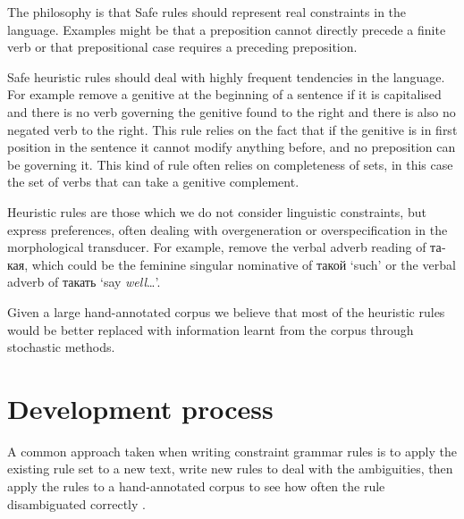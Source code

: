\documentclass[11pt]{article}
\newcommand{\rus}[1]{\foreignlanguage{russian}{#1}}
\begin{document}
The philosophy is that Safe rules should represent real constraints in
the language. Examples might be that a preposition cannot directly precede a finite verb
or that prepositional case requires a preceding preposition. 


Safe heuristic rules should deal with highly frequent tendencies in the language.
For example remove a genitive at the beginning of a sentence if it is capitalised
and there is no verb governing the genitive found to the right and there is also no
negated verb to the right. This rule relies on the fact that if the genitive is in first 
position in the sentence it cannot modify anything before, and no preposition 
can be governing it. This kind of rule often relies on completeness of sets, 
in this case the set of verbs that can take a genitive complement.



Heuristic rules are those which we do not consider linguistic constraints, but express
preferences, often dealing with overgeneration or overspecification in the morphological
transducer. For example, remove the verbal adverb reading of \rus{такая}, which could be 
the feminine singular nominative of \rus{такой} `such' or the verbal adverb 
of \rus{такать} `say \emph{well}\ldots'.


Given a large hand-annotated corpus we believe that most of the heuristic rules would be 
better replaced with information learnt from the corpus through stochastic methods. 



\section{Development process}
\label{sec:devel}

A common approach taken when writing constraint grammar rules is to 
apply the existing rule set to a new text, write new rules to deal with the 
ambiguities, then apply the rules to a hand-annotated corpus to see
how often the rule disambiguated correctly \cite{voutilainen99}.
\end{document}
